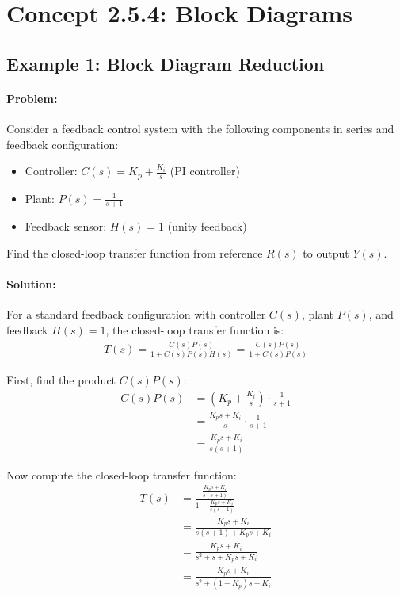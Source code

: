 \documentclass[11pt,a4paper]{article}
\begin{document}
\section{Concept 2.5.4: Block Diagrams}

\subsection{Example 1: Block Diagram Reduction}

\paragraph{Problem:} Consider a feedback control system with the following components in series and feedback configuration:
\begin{itemize}
\item Controller: $C(s) = K_p + \frac{K_i}{s}$ (PI controller)
\item Plant: $P(s) = \frac{1}{s+1}$
\item Feedback sensor: $H(s) = 1$ (unity feedback)
\end{itemize}

Find the closed-loop transfer function from reference $R(s)$ to output $Y(s)$.

\paragraph{Solution:}

For a standard feedback configuration with controller $C(s)$, plant $P(s)$, and feedback $H(s) = 1$, the closed-loop transfer function is:
\begin{align}
T(s) = \frac{C(s)P(s)}{1 + C(s)P(s)H(s)} = \frac{C(s)P(s)}{1 + C(s)P(s)}
\end{align}

First, find the product $C(s)P(s)$:
\begin{align}
C(s)P(s) &= \left(K_p + \frac{K_i}{s}\right) \cdot \frac{1}{s+1} \\
&= \frac{K_ps + K_i}{s} \cdot \frac{1}{s+1} \\
&= \frac{K_ps + K_i}{s(s+1)}
\end{align}

Now compute the closed-loop transfer function:
\begin{align}
T(s) &= \frac{\frac{K_ps + K_i}{s(s+1)}}{1 + \frac{K_ps + K_i}{s(s+1)}} \\
&= \frac{K_ps + K_i}{s(s+1) + K_ps + K_i} \\
&= \frac{K_ps + K_i}{s^2 + s + K_ps + K_i} \\
&= \frac{K_ps + K_i}{s^2 + (1+K_p)s + K_i}
\end{align}
\end{document}
